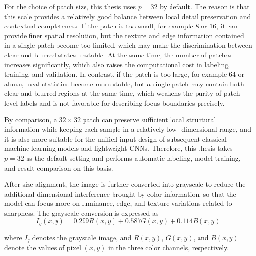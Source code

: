 \par For the choice of patch size, this thesis uses $p=32$ by default. The
reason is that this scale provides a relatively good balance between local
detail preservation and contextual completeness. If the patch is too small,
for example $8$ or $16$, it can provide finer spatial resolution, but the
texture and edge information contained in a single patch become too limited,
which may make the discrimination between clear and blurred states unstable.
At the same time, the number of patches increases significantly, which also
raises the computational cost in labeling, training, and validation. In
contrast, if the patch is too large, for example $64$ or above, local
statistics become more stable, but a single patch may contain both clear and
blurred regions at the same time, which weakens the purity of patch-level
labels and is not favorable for describing focus boundaries precisely.

\par By comparison, a $32\times 32$ patch can preserve sufficient local
structural information while keeping each sample in a relatively low-
dimensional range, and it is also more suitable for the unified input design
of subsequent classical machine learning models and lightweight CNNs.
Therefore, this thesis takes $p=32$ as the default setting and performs
automatic labeling, model training, and result comparison on this basis.

\par After size alignment, the image is further converted into grayscale
\cite{1284395} to reduce the additional dimensional interference brought by
color information, so that the model can focus more on luminance, edge, and
texture variations related to sharpness. The grayscale conversion is expressed
as
\begin{equation}
    I_g(x,y)=0.299R(x,y)+0.587G(x,y)+0.114B(x,y)
    \label{eq:grayscale}
\end{equation}
\par where $I_g$ denotes the grayscale image, and $R(x,y)$, $G(x,y)$, and
$B(x,y)$ denote the values of pixel $(x,y)$ in the three color channels,
respectively.

